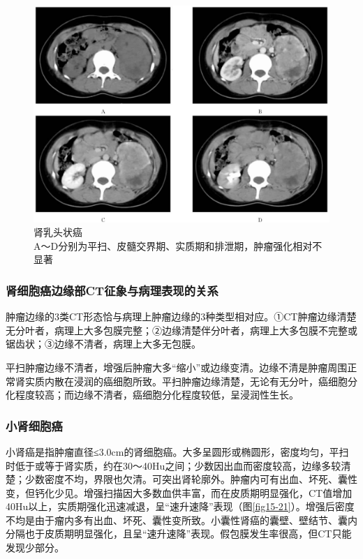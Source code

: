 \begin{figure}[!htbp]
 \centering
 \includegraphics[width=.7\textwidth,height=\textheight,keepaspectratio]{./images/Image00339.jpg}
 \captionsetup{justification=centering}
 \caption{肾乳头状癌\\{\small A～D分别为平扫、皮髓交界期、实质期和排泄期，肿瘤强化相对不显著}}
 \label{fig15-22}
  \end{figure} 

\subsubsection{肾细胞癌边缘部CT征象与病理表现的关系}

肿瘤边缘的3类CT形态恰与病理上肿瘤边缘的3种类型相对应。①CT肿瘤边缘清楚无分叶者，病理上大多包膜完整；②边缘清楚伴分叶者，病理上大多包膜不完整或锯齿状；③边缘不清者，病理上大多无包膜。

平扫肿瘤边缘不清者，增强后肿瘤大多“缩小”或边缘变清。边缘不清是肿瘤周围正常肾实质内散在浸润的癌细胞所致。平扫肿瘤边缘清楚，无论有无分叶，癌细胞分化程度较高；而边缘不清者，癌细胞分化程度较低，呈浸润性生长。

\subsubsection{小肾细胞癌}

小肾癌是指肿瘤直径≤3.0cm的肾细胞癌。大多呈圆形或椭圆形，密度均匀，平扫时低于或等于肾实质，约在30～40Hu之间；少数因出血而密度较高，边缘多较清楚；少数密度不均，界限也欠清。可突出肾轮廓外。肿瘤内可有出血、坏死、囊性变，但钙化少见。增强扫描因大多数血供丰富，而在皮质期明显强化，CT值增加40Hu以上，实质期强化迅速减退，呈“速升速降”表现（图\ref{fig15-21}）。增强后密度不均是由于瘤内多有出血、坏死、囊性变所致。小囊性肾癌的囊壁、壁结节、囊内分隔也于皮质期明显强化，且呈“速升速降”表现。假包膜发生率很高，但CT只能发现少部分。

